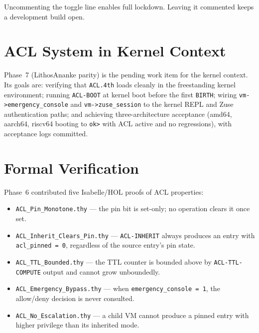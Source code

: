 Uncommenting the toggle line enables full lockdown. Leaving it commented
keeps a development build open.

\section{ACL System in Kernel Context}
\label{vol2:sec:acl:kernel}


Phase~7 (LithosAnanke parity) is the pending work item for the kernel
context. Its goals are: verifying that \texttt{ACL.4th} loads cleanly in
the freestanding kernel environment; running \texttt{ACL-BOOT} at kernel
boot before the first \texttt{BIRTH}; wiring \texttt{vm->emergency\_console}
and \texttt{vm->zuse\_session} to the kernel REPL and Zuse authentication
paths; and achieving three-architecture acceptance (amd64, aarch64, riscv64
booting to \texttt{ok>} with ACL active and no regressions), with acceptance
logs committed.

\section{Formal Verification}
\label{vol2:sec:acl:proofs}


Phase~6 contributed five Isabelle/HOL proofs of ACL properties:

\begin{itemize}
  \item \texttt{ACL\_Pin\_Monotone.thy} --- the pin bit is set-only; no
        operation clears it once set.
  \item \texttt{ACL\_Inherit\_Clears\_Pin.thy} --- \texttt{ACL-INHERIT}
        always produces an entry with \texttt{acl\_pinned = 0}, regardless
        of the source entry's pin state.
  \item \texttt{ACL\_TTL\_Bounded.thy} --- the TTL counter is bounded above
        by \texttt{ACL-TTL-COMPUTE} output and cannot grow unboundedly.
  \item \texttt{ACL\_Emergency\_Bypass.thy} --- when
        \texttt{emergency\_console = 1}, the allow/deny decision is never
        consulted.
  \item \texttt{ACL\_No\_Escalation.thy} --- a child VM cannot produce a
        pinned entry with higher privilege than its inherited mode.
\end{itemize}

